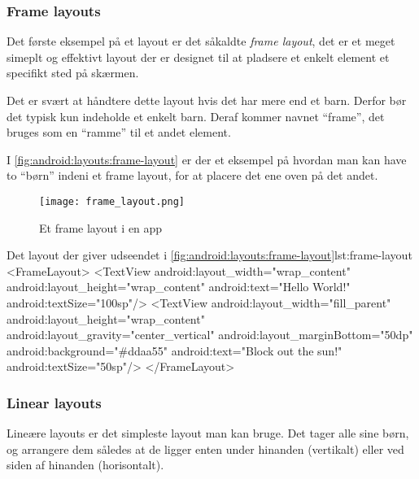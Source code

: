\cleartoleftpage
\FloatBarrier

\subsubsection{Frame layouts}

Det første eksempel på et layout er det såkaldte \textit{frame layout}, det er et meget simeplt og effektivt layout der er designet til at pladsere et enkelt element et specifikt sted på skærmen.

Det er svært at håndtere dette layout hvis det har mere end et barn. Derfor bør 
det typisk kun indeholde et enkelt barn. Deraf kommer navnet ``frame'', det 
bruges som en ``ramme'' til et andet element.

I \autoref{fig:android:layouts:frame-layout} er der et eksempel på hvordan man 
kan have to ``børn'' indeni et frame layout, for at placere det ene oven på det 
andet.

\begin{figure}[!b]
	\begin{center}
		\texttt{[image: frame\_layout.png]}
		\caption{Et frame layout i en app}
		\label{fig:android:layouts:frame-layout}
	\end{center}
\end{figure}


\begin{XmlCode}{Det layout der giver udseendet i \autoref{fig:android:layouts:frame-layout}}{lst:frame-layout}
	<FrameLayout>
		<TextView
			android:layout_width="wrap_content"
			android:layout_height="wrap_content"
			android:text="Hello World!"
			android:textSize="100sp"/>
		<TextView
			android:layout_width="fill_parent"
			android:layout_height="wrap_content"
			android:layout_gravity="center_vertical"
			android:layout_marginBottom="50dp"
			android:background="#ddaa55"
			android:text="Block out the sun!"
			android:textSize="50sp"/>
	</FrameLayout>
\end{XmlCode}

\clearpage
\FloatBarrier

\subsubsection{Linear layouts}
Lineære layouts er det simpleste layout man kan bruge. Det tager alle sine 
børn, og arrangere dem således at de ligger enten under hinanden (vertikalt) 
eller ved siden af hinanden (horisontalt).

